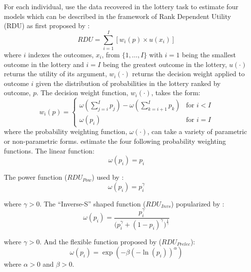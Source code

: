 \documentclass[../main.tex]{subfiles}
\begin{document}
For each individual, \textcite{Harrison2016} use the data recovered in the lottery task to estimate four models which can be described in the framework of Rank Dependent Utility (RDU) as first proposed by \textcite{Quiggin1982}:
\begin{equation}
	\label{eq4:RDU}
	RDU = \sum_{i=1}^{I} \left[ w_i(p) \times u(x_i) \right]
\end{equation}
\noindent where $i$ indexes the outcomes, $x_i$, from $\{1,\ldots,I\}$ with $i=1$ being the smallest outcome in the lottery and $i=I$ being the greatest outcome in the lottery, $u(\cdot)$ returns the utility of its argument, $w_i(\cdot)$ returns the decision weight applied to outcome $i$ given the distribution of probabilities in the lottery ranked by outcome, $p$.
The decision weight function, $w_i(\cdot)$, takes the form:
\begin{equation}
	\label{eq4:dweight}
	w_i(p) =
	\begin{cases}
		\omega\left(\displaystyle\sum_{j=i}^I p_j\right) - \omega\left(\displaystyle\sum_{k=i+1}^I p_k\right) & \text{for } i<I \\
		\omega(p_i) & \text{for } i = I
	\end{cases}
\end{equation}
\noindent where the probability weighting function, $\omega(\cdot)$, can take a variety of parametric or non-parametric forms.
\textcite{Harrison2016} estimate the four following probability weighting functions. The linear function:
\begin{equation}
	\label{eq4:pw:eut}
	\omega(p_i) = p_i
\end{equation}

\noindent The power function ($\mathit{RDU_{Pow}}$) used by \textcite{Quiggin1982}:
\begin{equation}
	\label{eq4:pw:pow}
	\omega(p_i)=p_i^\gamma
\end{equation}

\noindent where $\gamma > 0$. The \enquote{Inverse-S} shaped function ($\mathit{RDU_{Invs}}$) popularized by \textcite{Tversky1992}:
\begin{equation}
	\label{eq4:pw:inv}
	\omega(p_i) = \frac{p_i^\gamma}{\biggl(p_i^\gamma + {(1-p_i)}^\gamma\biggr)^{ \frac{1}{\gamma} } }
\end{equation}

\noindent where $\gamma > 0$. And the flexible function proposed by \textcite{Prelec1998} ($\mathit{RDU_{Prelec}}$):
\begin{equation}
	\label{eq4:pw:pre}
	\omega(p_i)=\exp(-\beta(-\ln(p_i))^\alpha)
\end{equation}
\noindent where $\alpha > 0$ and $\beta > 0$.
\end{document}
